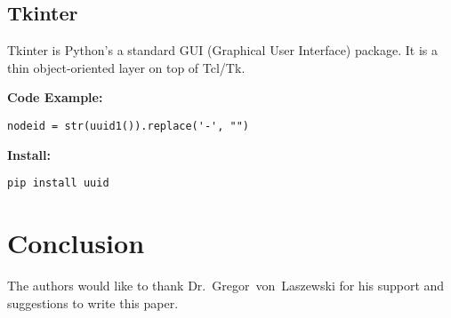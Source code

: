 \subsection{Tkinter}

Tkinter is Python's a standard GUI (Graphical User Interface) package.
It is a thin object-oriented layer on top of Tcl/Tk\cite{hid-sp18-414-www-tkInter}.

\bigskip
\noindent
\textbf{Code Example:}
\begin{footnotesize}
\begin{verbatim}
nodeid = str(uuid1()).replace('-', "")
\end{verbatim}
\end{footnotesize}
\noindent
\textbf{Install:}
\begin{footnotesize}
\begin{verbatim}
pip install uuid
\end{verbatim}
\end{footnotesize}

\section{Conclusion}


\begin{acks}

The authors would like to thank Dr.~Gregor~von~Laszewski for his
support and suggestions to write this paper.

\end{acks}


 


